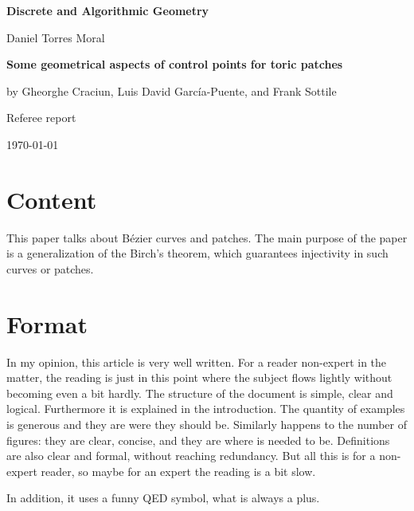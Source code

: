 \documentclass[11pt]{amsart}
\begin{document}
\begin{center}
\textbf{\sffamily
   Discrete and Algorithmic Geometry }

\medskip
  Daniel Torres Moral
\end{center}

\bigskip

\begin{center}
\large{
  \textbf{\sffamily Some geometrical aspects of control points for toric patches} 
  
  by Gheorghe Craciun, Luis David García-Puente, and Frank Sottile}
  
\small{  Referee report}

\bigskip
\today

\end{center}

\bigskip

\section*{Content}

  This paper talks about Bézier curves and patches. The main purpose of the paper is a generalization of the Birch's theorem, which guarantees injectivity in such curves or patches. 

\section*{Format}

  In my opinion, this article is very well written. For a reader non-expert in the matter, the reading is just in this point where the subject flows lightly without becoming even a bit hardly. The structure of the document is simple, clear and logical. Furthermore it is explained in the introduction. The quantity of examples is generous and they are were they should be. Similarly happens to the number of figures: they are clear, concise, and they are where is needed to be. Definitions are also clear and formal, without reaching redundancy. But all this is for a non-expert reader, so maybe for an expert the reading is a bit slow.
  
  In addition, it uses a funny QED symbol, what is always a plus.
\end{document}
